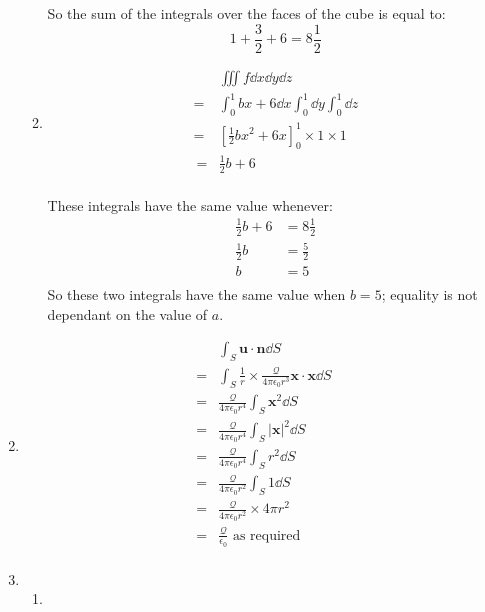 \documentclass[10pt,\jkfside,a4paper]{article}
\begin{document}
\begin{enumerate}
\begin{enumerate}
So the sum of the integrals over the faces of the cube is equal to:
\[
1 + \frac{3}{2} + 6 = 8\frac{1}{2}
\]

\item 

\[
\begin{split}
 & \iiint f \dd{x}\dd{y}\dd{z} \\
=& \int^1_0 bx + 6 \dd{x} \int^1_0\dd{y}\int^1_0\dd{z} \\
=& \left[\frac{1}{2}bx^2 + 6x\right]^1_0\times 1 \times 1 \\\
=& \frac{1}{2}b + 6 \\
\end{split}
\]

These integrals have the same value whenever:
\[
\begin{split}
\frac{1}{2} b + 6 &= 8\frac{1}{2} \\
\frac{1}{2}b &= \frac{5}{2} \\
b &= 5 \\
\end{split}
\]
So these two integrals have the same value when $b = 5$; equality is not dependant on the value of $a$.

\end{enumerate}

\item 
\[
\begin{split}
 & \int_S \mathbf{u}\cdot \mathbf{n}\dd{S} \\
=& \int_S \frac{1}{r} \times \frac{\mathcal{Q}}{4\pi \epsilon_0 r^3} \mathbf{x}\cdot\mathbf{x} \dd{S} \\
=& \frac{\mathcal{Q}}{4\pi \epsilon_0 r^4}\int_S \mathbf{x}^2 \dd{S} \\
=& \frac{\mathcal{Q}}{4\pi \epsilon_0 r^4}\int_S |\mathbf{x}|^2 \dd{S} \\
=& \frac{\mathcal{Q}}{4\pi \epsilon_0 r^4}\int_S r^2 \dd{S} \\
=& \frac{\mathcal{Q}}{4\pi \epsilon_0 r^2}\int_S 1 \dd{S} \\
=& \frac{\mathcal{Q}}{4\pi \epsilon_0 r^2} \times 4\pi r^2 \\
=& \frac{\mathcal{Q}}{\epsilon_0} \text{ as required}\\
\end{split}
\]

\item

\begin{enumerate}

\item 


\end{enumerate}
\end{enumerate}
\end{document}
